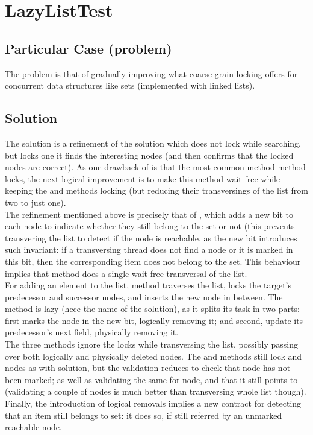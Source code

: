 \section{\textbf{LazyListTest}}

\subsection{Particular Case (problem)}
The problem is that of gradually improving what coarse grain locking
offers for concurrent data structures like sets (implemented with
linked lists).

\subsection{Solution}
The  solution is a refinement of the 
solution which does not lock while searching, but locks one it finds
the interesting nodes (and then confirms that the locked nodes are
correct). As one drawback of  is that the most
common method  method locks, the next logical improvement
is to make this method wait-free while keeping the  and
 methods locking (but reducing their transversings of the
list from two to just one). \\

The refinement mentioned above is precisely that of ,
which adds a new bit to each node to indicate whether they still
belong to the set or not (this prevents transvering the list to detect
if the node is reachable, as the new bit introduces such invariant: if
a transversing thread does not find a node or it is marked in this
bit, then the corresponding item does not belong to the set. This
behaviour implies that  method does a single wait-free
transversal of the list. \\

For adding an element to the list,  method traverses the list,
locks the target's predecessor and successor nodes, and inserts the
new node in between. The    
method is lazy (hece the name of the solution), as it splits its task in
two parts: first marks the node in the new bit, logically removing it;
and second, update its predecessor's next field, physically removing
it. \\

The three methods ignore the locks while transversing the list,
possibly passing over both logically and physically deleted nodes. The
 and  methods still lock  and  nodes
as with  solution, but the validation reduces to
check that  node has not been marked; as well as validating
the same for  node, and that it still points to 
(validating a couple of nodes is much better than transversing whole
list though). Finally, the introduction of logical removals implies a
new contract for detecting that an item still belongs to set: it does
so, if still referred by an unmarked reachable node. \\

